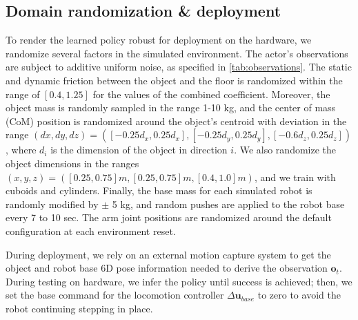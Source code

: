 \subsection{Domain randomization \& deployment}
\label{sec:domain_randomization}
To render the learned policy robust for deployment on the hardware, we randomize several factors in the simulated environment. The actor's observations are subject to additive uniform noise, as specified in \cref{tab:observations}. The static and dynamic friction between the object and the floor is randomized within the range of $[0.4,1.25]$ for the values of the combined coefficient. Moreover, the object mass is randomly sampled in the range 1-10 kg, and the center of mass (CoM) position is randomized around the object's centroid with deviation in the range $(dx, dy, dz)=([-0.25d_x, 0.25d_x], [-0.25d_y, 0.25d_y], [-0.6d_z, 0.25d_z])$, where $d_i$ is the dimension of the object in direction $i$. We also randomize the object dimensions in the ranges $(x, y, z)=([0.25, 0.75]m, [0.25, 0.75]m, [0.4, 1.0]m)$, and we train with cuboids and cylinders. Finally, the base mass for each simulated robot is randomly modified by $\pm$ 5 kg, and random pushes are applied to the robot base every 7 to 10 sec. The arm joint positions are randomized around the default configuration at each environment reset.

During deployment, we rely on an external motion capture system to get the object and robot base 6D pose information needed to derive the observation $\pmb o_t$. During testing on hardware, we infer the policy until success is achieved; then, we set the base command for the locomotion controller $\Delta \pmb u_{base}$ to zero to avoid the robot continuing stepping in place.